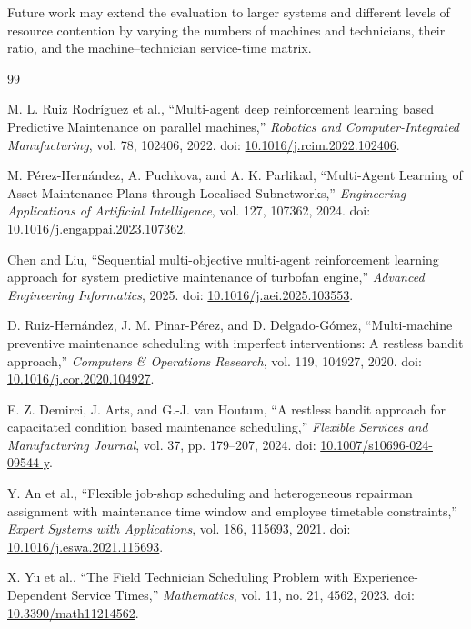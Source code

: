 \documentclass[11pt]{article}
\begin{document}
Future work may extend the evaluation to larger systems and different levels of resource contention by varying the numbers of machines and technicians, their ratio, and the machine--technician service-time matrix.

\begin{thebibliography}{99}

M. L. Ruiz Rodríguez et al., ``Multi-agent deep reinforcement learning based Predictive Maintenance on parallel machines,'' \emph{Robotics and Computer-Integrated Manufacturing}, vol. 78, 102406, 2022. doi: \href{https://doi.org/10.1016/j.rcim.2022.102406}{10.1016/j.rcim.2022.102406}.

M. Pérez-Hernández, A. Puchkova, and A. K. Parlikad, ``Multi-Agent Learning of Asset Maintenance Plans through Localised Subnetworks,'' \emph{Engineering Applications of Artificial Intelligence}, vol. 127, 107362, 2024. doi: \href{https://doi.org/10.1016/j.engappai.2023.107362}{10.1016/j.engappai.2023.107362}.

Chen and Liu, ``Sequential multi-objective multi-agent reinforcement learning approach for system predictive maintenance of turbofan engine,'' \emph{Advanced Engineering Informatics}, 2025. doi: \href{https://doi.org/10.1016/j.aei.2025.103553}{10.1016/j.aei.2025.103553}.

D. Ruiz-Hernández, J. M. Pinar-Pérez, and D. Delgado-Gómez, ``Multi-machine preventive maintenance scheduling with imperfect interventions: A restless bandit approach,'' \emph{Computers \& Operations Research}, vol. 119, 104927, 2020. doi: \href{https://doi.org/10.1016/j.cor.2020.104927}{10.1016/j.cor.2020.104927}.

E. Z. Demirci, J. Arts, and G.-J. van Houtum, ``A restless bandit approach for capacitated condition based maintenance scheduling,'' \emph{Flexible Services and Manufacturing Journal}, vol. 37, pp. 179--207, 2024. doi: \href{https://doi.org/10.1007/s10696-024-09544-y}{10.1007/s10696-024-09544-y}.

Y. An et al., ``Flexible job-shop scheduling and heterogeneous repairman assignment with maintenance time window and employee timetable constraints,'' \emph{Expert Systems with Applications}, vol. 186, 115693, 2021. doi: \href{https://doi.org/10.1016/j.eswa.2021.115693}{10.1016/j.eswa.2021.115693}.

X. Yu et al., ``The Field Technician Scheduling Problem with Experience-Dependent Service Times,'' \emph{Mathematics}, vol. 11, no. 21, 4562, 2023. doi: \href{https://doi.org/10.3390/math11214562}{10.3390/math11214562}.


\end{thebibliography}
\end{document}

